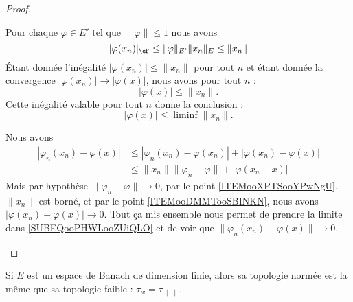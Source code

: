 \begin{proof}
\begin{subproof}
		Pour chaque \( \varphi\in E'\) tel que \( \| \varphi \|\leq 1\) nous avons
		\begin{equation}
			| \varphi(x_n) |_{\eF}\leq \| \varphi \|_{E'}\| x_n \|_E\leq \| x_n \|
		\end{equation}
		Étant donnée l'inégalité \( | \varphi(x_n) |\leq \| x_n \|\) pour tout \( n\) et étant donnée la convergence \( | \varphi(x_n) |\to | \varphi(x) |\), nous avons pour tout \( n\) :
		\begin{equation}
			| \varphi(x) |\leq \| x_n \|.
		\end{equation}
		Cette inégalité valable pour tout \( n \) donne la conclusion :
		\begin{equation}
			| \varphi(x) |\leq  \liminf\| x_n \|.
		\end{equation}



		Nous avons
		\begin{subequations}        \label{SUBEQooPHWLooZUiQLO}
			\begin{align}
				| \varphi_n(x_n)-\varphi(x) | & \leq | \varphi_n(x_n)-\varphi(x_n) |+| \varphi(x_n)-\varphi(x) | \\
				                              & \leq \| x_n \|\| \varphi_n-\varphi \|+| \varphi(x_n-x) |
			\end{align}
		\end{subequations}
		Mais par hypothèse \( \| \varphi_n-\varphi \|\to 0\), par le point \ref{ITEMooXPTSooYPwNgU}, \( \| x_n \|\) est borné, et par le point \ref{ITEMooDMMTooSBINKN}, nous avons \( | \varphi(x_n)-\varphi(x) |\to 0\). Tout ça mis ensemble nous permet de prendre la limite dans \eqref{SUBEQooPHWLooZUiQLO} et de voir que \( \| \varphi_n(x_n)-\varphi(x) \|\to 0\).

	\end{subproof}
\end{proof}


\begin{proposition}
	Si \( E\) est un espace de Banach de dimension finie, alors sa topologie normée est la même que sa topologie faible : \( \tau_w=\tau_{\| . \|}\).
\end{proposition}

